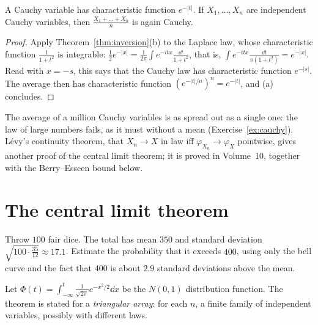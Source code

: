 \begin{corollary}\label{cor:cauchy}
A Cauchy variable has characteristic function $e^{-|t|}$. If $X_1,\dots,X_n$ are independent Cauchy variables, then $\frac{X_1+\dots+X_n}n$ is
again Cauchy.
\end{corollary}
\begin{proof}
Apply Theorem~\ref{thm:inversion}(b) to the Laplace law, whose characteristic function $\frac1{1+t^2}$ is integrable:
$\frac12e^{-|x|}=\frac1{2\pi}\int e^{-itx}\frac{\dd t}{1+t^2}$, that is, $\int e^{-itx}\frac{\dd t}{\pi(1+t^2)}=e^{-|x|}$. Read with $x=-s$, this says that the Cauchy law has
characteristic function $e^{-|s|}$. The average then has characteristic function $(e^{-|t|/n})^n=e^{-|t|}$, and (a) concludes.
\end{proof}

The average of a million Cauchy variables is as spread out as a single one: the law of large numbers fails, as it
must without a mean (Exercise~\ref{ex:cauchy}). Lévy's continuity theorem, that $X_n\to X$ in law iff $\varphi_{X_n}\to\varphi_X$ pointwise, gives
another proof of the central limit theorem; it is proved in Volume~10, together with the Berry--Esseen bound below.

\section{The central limit theorem}

\begin{think}
Throw $100$ fair dice. The total has mean $350$ and standard deviation $\sqrt{100\cdot\frac{35}{12}}\approx17.1$. Estimate the probability that it
exceeds $400$, using only the bell curve and the fact that $400$ is about $2.9$ standard deviations above the mean.
\end{think}

Let $\Phi(t)=\int_{-\infty}^t\frac1{\sqrt{2\pi}}e^{-x^2/2}\dd x$ be the $N(0,1)$ distribution function. The theorem is stated for a \emph{triangular array}: for
each $n$, a finite family of independent variables, possibly with different laws.

